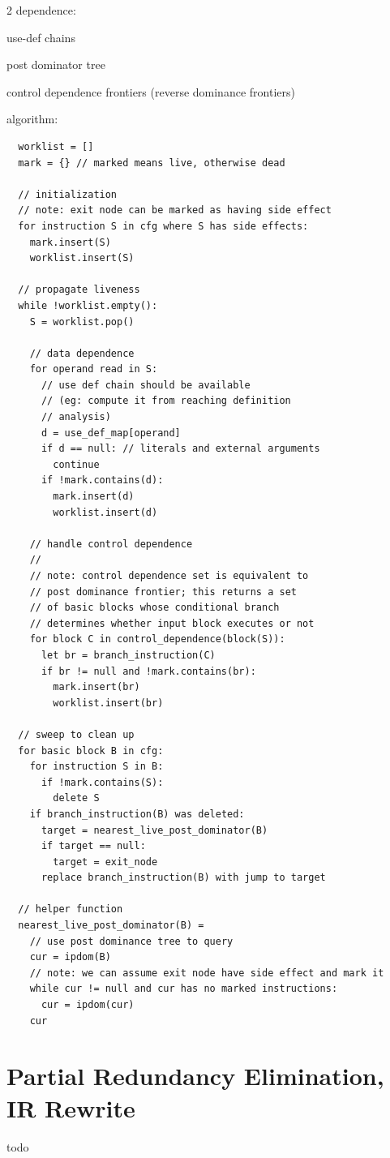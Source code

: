 \documentclass[8pt]{extarticle}
\begin{document}
\begin{multicols*}{2}
  dependence:

  use-def chains

  post dominator tree

  control dependence frontiers (reverse dominance frontiers)

  algorithm:

  \begin{verbatim}
  worklist = []
  mark = {} // marked means live, otherwise dead

  // initialization
  // note: exit node can be marked as having side effect
  for instruction S in cfg where S has side effects:
    mark.insert(S)
    worklist.insert(S)

  // propagate liveness
  while !worklist.empty():
    S = worklist.pop()

    // data dependence
    for operand read in S:
      // use def chain should be available
      // (eg: compute it from reaching definition
      // analysis)
      d = use_def_map[operand]
      if d == null: // literals and external arguments
        continue
      if !mark.contains(d):
        mark.insert(d)
        worklist.insert(d)

    // handle control dependence
    //
    // note: control dependence set is equivalent to
    // post dominance frontier; this returns a set
    // of basic blocks whose conditional branch 
    // determines whether input block executes or not
    for block C in control_dependence(block(S)):
      let br = branch_instruction(C)
      if br != null and !mark.contains(br):
        mark.insert(br)
        worklist.insert(br)

  // sweep to clean up
  for basic block B in cfg:
    for instruction S in B:
      if !mark.contains(S):
        delete S
    if branch_instruction(B) was deleted:
      target = nearest_live_post_dominator(B)
      if target == null:
        target = exit_node
      replace branch_instruction(B) with jump to target

  // helper function
  nearest_live_post_dominator(B) =
    // use post dominance tree to query
    cur = ipdom(B)
    // note: we can assume exit node have side effect and mark it
    while cur != null and cur has no marked instructions:
      cur = ipdom(cur)
    cur
  \end{verbatim}
  
  \vfill\null
  \columnbreak

  \section{Partial Redundancy Elimination, IR Rewrite}
  todo


\end{multicols*}
\end{document}
